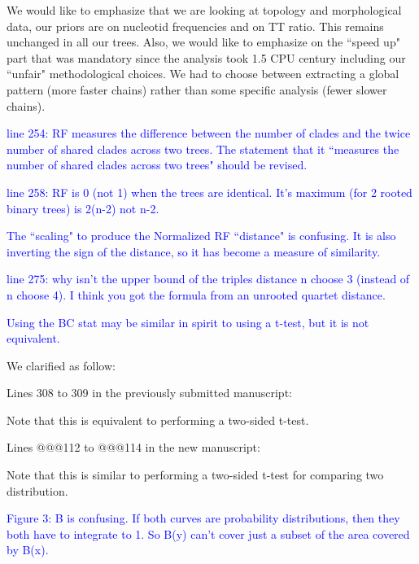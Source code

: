 \documentclass[11pt]{letter}
\begin{document}
\begin{letter}{}
We would like to emphasize that we are looking at topology and morphological data, our priors are on nucleotid frequencies and on TT ratio. This remains unchanged in all our trees. Also, we would like to emphasize on the ``speed up" part that was mandatory since the analysis took 1.5 CPU century including our ``unfair" methodological choices. We had to choose between extracting a global pattern (more faster chains) rather than some specific analysis (fewer slower chains).

\textcolor{blue}{line 254: RF measures the difference between the number of clades and the twice number of shared clades across two trees. The statement that it ``measures the number of shared clades across two trees" should be revised.}


\textcolor{blue}{line 258: RF is 0 (not 1) when the trees are identical. It's maximum (for 2 rooted binary trees) is 2(n-2) not n-2.}


\textcolor{blue}{The ``scaling" to produce the Normalized RF ``distance" is confusing. It is also inverting the sign of the distance, so it has become a measure of similarity.}


\textcolor{blue}{line 275: why isn't the upper bound of the triples distance n choose 3 (instead of n choose 4). I think you got the formula from an unrooted quartet distance.}


\textcolor{blue}{Using the BC stat may be similar in spirit to using a t-test, but it is not equivalent.}

We clarified as follow:

Lines 308 to 309 in the previously submitted manuscript:

\hfill\begin{minipage}{\dimexpr\textwidth-1cm}
Note that this is equivalent to performing a two-sided t-test.
\end{minipage}

Lines @@@112 to @@@114 in the new manuscript:

\hfill\begin{minipage}{\dimexpr\textwidth-1cm}
Note that this is similar to performing a two-sided t-test for comparing two distribution.
\end{minipage}


\textcolor{blue}{Figure 3: B is confusing. If both curves are probability distributions, then they both have to integrate to 1. So B(y) can't cover just a subset of the area covered by B(x).}


\end{letter}
\end{document}
